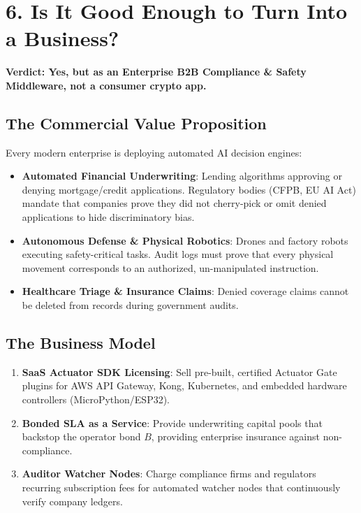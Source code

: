 \documentclass[11pt,a4paper]{article}
\begin{document}
\section{6. Is It Good Enough to Turn Into a Business?}

\textbf{Verdict: Yes, but as an Enterprise B2B Compliance \& Safety Middleware, not a consumer crypto app.}

\subsection{The Commercial Value Proposition}
Every modern enterprise is deploying automated AI decision engines:
\begin{itemize}[leftmargin=1.5em]
    \item \textbf{Automated Financial Underwriting}: Lending algorithms approving or denying mortgage/credit applications. Regulatory bodies (CFPB, EU AI Act) mandate that companies prove they did not cherry-pick or omit denied applications to hide discriminatory bias.
    \item \textbf{Autonomous Defense \& Physical Robotics}: Drones and factory robots executing safety-critical tasks. Audit logs must prove that every physical movement corresponds to an authorized, un-manipulated instruction.
    \item \textbf{Healthcare Triage \& Insurance Claims}: Denied coverage claims cannot be deleted from records during government audits.
\end{itemize}

\subsection{The Business Model}
\begin{enumerate}
    \item \textbf{SaaS Actuator SDK Licensing}: Sell pre-built, certified Actuator Gate plugins for AWS API Gateway, Kong, Kubernetes, and embedded hardware controllers (MicroPython/ESP32).
    \item \textbf{Bonded SLA as a Service}: Provide underwriting capital pools that backstop the operator bond $B$, providing enterprise insurance against non-compliance.
    \item \textbf{Auditor Watcher Nodes}: Charge compliance firms and regulators recurring subscription fees for automated watcher nodes that continuously verify company ledgers.
\end{enumerate}
\end{document}

